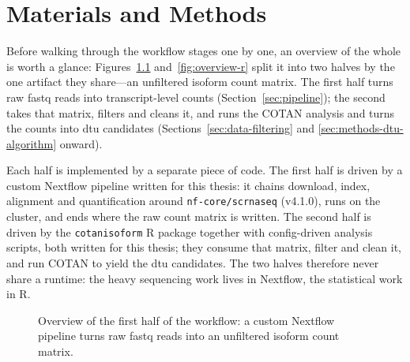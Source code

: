\chapter{Materials and Methods}\label{chap:methods}


Before walking through the workflow stages one by one, an overview of the whole is worth a glance: Figures~\ref{fig:overview} and~\ref{fig:overview-r} split it into two halves by the one artifact they share---an unfiltered isoform count matrix. The first half turns raw \gls{fastq} reads into transcript-level counts (Section~\ref{sec:pipeline}); the second takes that matrix, filters and cleans it, and runs the COTAN analysis and turns the counts into \gls{dtu} candidates (Sections~\ref{sec:data-filtering} and \ref{sec:methods-dtu-algorithm} onward).

Each half is implemented by a separate piece of code. The first half is driven by a custom Nextflow pipeline written for this thesis: it chains download, index, alignment and quantification around \texttt{nf-core/scrnaseq} (v4.1.0), runs on the cluster, and ends where the raw count matrix is written. The second half is driven by the \texttt{cotanisoform} R package together with config-driven analysis scripts, both written for this thesis; they consume that matrix, filter and clean it, and run COTAN to yield the \gls{dtu} candidates. The two halves therefore never share a runtime: the heavy sequencing work lives in Nextflow, the statistical work in R.


\usetikzlibrary{arrows.meta, positioning, decorations.pathreplacing}
\begingroup
\setlength{\textfloatsep}{2em plus 2pt minus 4pt}
\setlength{\floatsep}{1em plus 2pt minus 2pt}
\vspace{2em}
\begin{figure}[htbp]
    \centering
    \caption{Overview of the first half of the workflow: a custom Nextflow pipeline turns raw \gls{fastq} reads into an unfiltered isoform count matrix.}
    \label{fig:overview}
\end{figure}

